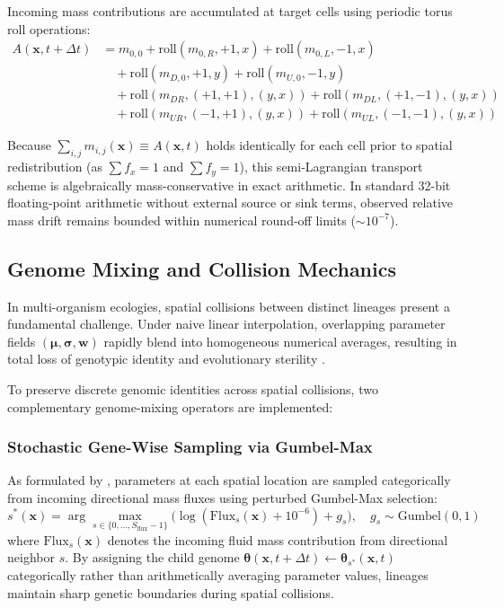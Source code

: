 Incoming mass contributions are accumulated at target cells using periodic torus roll operations:
\begin{equation}
\begin{split}
A(\mathbf{x}, t + \Delta t) &= m_{0,0} + \text{roll}(m_{0,R}, +1, x) + \text{roll}(m_{0,L}, -1, x) \\
&\quad + \text{roll}(m_{D,0}, +1, y) + \text{roll}(m_{U,0}, -1, y) \\
&\quad + \text{roll}(m_{DR}, (+1, +1), (y, x)) + \text{roll}(m_{DL}, (+1, -1), (y, x)) \\
&\quad + \text{roll}(m_{UR}, (-1, +1), (y, x)) + \text{roll}(m_{UL}, (-1, -1), (y, x))
\end{split}
\label{eq:mass_accumulation_roll}
\end{equation}

Because $\sum_{i,j} m_{i,j}(\mathbf{x}) \equiv A(\mathbf{x}, t)$ holds identically for each cell prior to spatial redistribution (as $\sum f_x = 1$ and $\sum f_y = 1$), this semi-Lagrangian transport scheme is algebraically mass-conservative in exact arithmetic. In standard 32-bit floating-point arithmetic without external source or sink terms, observed relative mass drift remains bounded within numerical round-off limits ($\sim 10^{-7}$).

\subsection{Genome Mixing and Collision Mechanics}
\label{subsec:model_genome_mixing}

In multi-organism ecologies, spatial collisions between distinct lineages present a fundamental challenge. Under naive linear interpolation, overlapping parameter fields $(\boldsymbol{\mu}, \boldsymbol{\sigma}, \mathbf{w})$ rapidly blend into homogeneous numerical averages, resulting in total loss of genotypic identity and evolutionary sterility \parencite{plantec2025flowlenia, michel2025exploring}.

To preserve discrete genomic identities across spatial collisions, two complementary genome-mixing operators are implemented:

\subsubsection{Stochastic Gene-Wise Sampling via Gumbel-Max}
As formulated by \textcite{plantec2025flowlenia}, parameters at each spatial location are sampled categorically from incoming directional mass fluxes using perturbed Gumbel-Max selection:
\begin{equation}
s^*(\mathbf{x}) = \arg\max_{s \in \{0, \dots, S_{\text{flux}}-1\}} \Big( \log(\text{Flux}_s(\mathbf{x}) + 10^{-6}) + g_s \Big), \quad g_s \sim \text{Gumbel}(0, 1)
\label{eq:gumbel_max_mixing}
\end{equation}
where $\text{Flux}_s(\mathbf{x})$ denotes the incoming fluid mass contribution from directional neighbor $s$. By assigning the child genome $\boldsymbol{\theta}(\mathbf{x}, t + \Delta t) \leftarrow \boldsymbol{\theta}_{s^*}(\mathbf{x}, t)$ categorically rather than arithmetically averaging parameter values, lineages maintain sharp genetic boundaries during spatial collisions.

